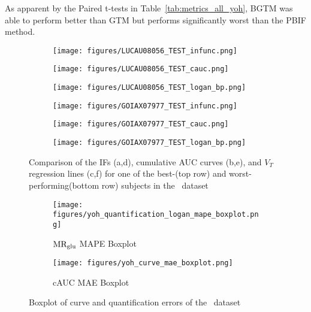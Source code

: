 As apparent by the Paired t-tests in Table~\ref{tab:metrics_all_yoh}, BGTM was able to perform better than GTM but performs significantly worst than the PBIF method.

\begin{figure}[p]
	\centering
	\begin{subfigure}[b]{0.322\textwidth}
		\texttt{[image: figures/LUCAU08056\_TEST\_infunc.png]}
		\caption{}
	\end{subfigure}
	\begin{subfigure}[b]{0.322\textwidth}
		\texttt{[image: figures/LUCAU08056\_TEST\_cauc.png]}
		\caption{}
	\end{subfigure}
	\begin{subfigure}[b]{0.322\textwidth}
		\texttt{[image: figures/LUCAU08056\_TEST\_logan\_bp.png]}
		\caption{}
	\end{subfigure}
	\begin{subfigure}[b]{0.322\textwidth}
		\texttt{[image: figures/GOIAX07977\_TEST\_infunc.png]}
		\caption{}
	\end{subfigure}
	\begin{subfigure}[b]{0.322\textwidth}
		\texttt{[image: figures/GOIAX07977\_TEST\_cauc.png]}
		\caption{}
	\end{subfigure}
	\begin{subfigure}[b]{0.322\textwidth}
		\texttt{[image: figures/GOIAX07977\_TEST\_logan\_bp.png]}
		\caption{}
	\end{subfigure}
	\caption{Comparison of the IFs (a,d), cumulative AUC curves (b,e), and $V_T$ regression lines (c,f) for one of the best-(top row) and worst-performing(bottom row) subjects in the \yohimbine\ dataset}
	\label{fig:yoh_ifs}
\end{figure}

\begin{figure}[p]
	\centering
	\begin{subfigure}[b]{0.45\textwidth}
		\texttt{[image: figures/yoh\_quantification\_logan\_mape\_boxplot.png]}
		\caption{\(\text{MR}_{\text{glu}}\) MAPE Boxplot}
		\label{subfig:yoh_mape_boxplot}
	\end{subfigure}
	\begin{subfigure}[b]{0.45\textwidth}
		\texttt{[image: figures/yoh\_curve\_mae\_boxplot.png]}
		\caption{cAUC MAE Boxplot}
		\label{subfig:yoh_cauc_boxplot}
	\end{subfigure}
	\caption{Boxplot of curve and quantification errors of the \yohimbine\ dataset}
	\label{fig:yoh_boxplots}
\end{figure}


